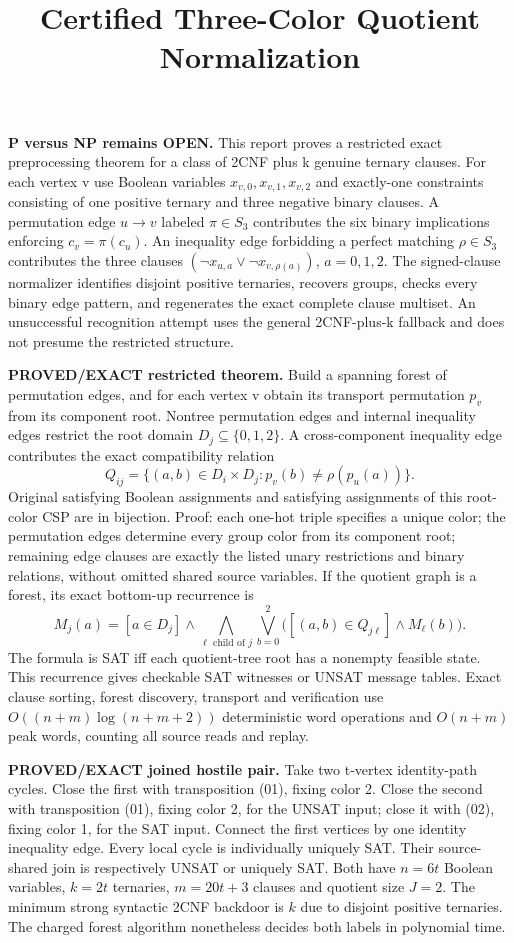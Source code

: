 \documentclass{article}
\title{Certified Three-Color Quotient Normalization}
\begin{document}
\maketitle
\textbf{P versus NP remains OPEN.}
This report proves a restricted exact preprocessing theorem for a class of 2CNF plus k genuine ternary clauses.
For each vertex v use Boolean variables $x_{v,0},x_{v,1},x_{v,2}$ and exactly-one constraints consisting of one positive ternary and three negative binary clauses. A permutation edge $u\to v$ labeled $\pi\in S_3$ contributes the six binary implications enforcing $c_v=\pi(c_u)$. An inequality edge forbidding a perfect matching $\rho\in S_3$ contributes the three clauses $(\neg x_{u,a}\vee\neg x_{v,\rho(a)})$, $a=0,1,2$.
The signed-clause normalizer identifies disjoint positive ternaries, recovers groups, checks every binary edge pattern, and regenerates the exact complete clause multiset. An unsuccessful recognition attempt uses the general 2CNF-plus-k fallback and does not presume the restricted structure.

\textbf{PROVED/EXACT restricted theorem.}
Build a spanning forest of permutation edges, and for each vertex v obtain its transport permutation $p_v$ from its component root. Nontree permutation edges and internal inequality edges restrict the root domain $D_j\subseteq\{0,1,2\}$. A cross-component inequality edge contributes the exact compatibility relation
\[
Q_{ij}=\{(a,b)\in D_i\times D_j:p_v(b)\ne\rho(p_u(a))\}.
\]
Original satisfying Boolean assignments and satisfying assignments of this root-color CSP are in bijection. Proof: each one-hot triple specifies a unique color; the permutation edges determine every group color from its component root; remaining edge clauses are exactly the listed unary restrictions and binary relations, without omitted shared source variables.
If the quotient graph is a forest, its exact bottom-up recurrence is
\[
M_j(a)=[a\in D_j]\wedge\bigwedge_{\ell\text{ child of }j}\bigvee_{b=0}^2
\bigl([(a,b)\in Q_{j\ell}]\wedge M_\ell(b)\bigr).
\]
The formula is SAT iff each quotient-tree root has a nonempty feasible state. This recurrence gives checkable SAT witnesses or UNSAT message tables. Exact clause sorting, forest discovery, transport and verification use $O((n+m)\log(n+m+2))$ deterministic word operations and $O(n+m)$ peak words, counting all source reads and replay.

\textbf{PROVED/EXACT joined hostile pair.}
Take two t-vertex identity-path cycles. Close the first with transposition (01), fixing color 2. Close the second with transposition (01), fixing color 2, for the UNSAT input; close it with (02), fixing color 1, for the SAT input. Connect the first vertices by one identity inequality edge. Every local cycle is individually uniquely SAT. Their source-shared join is respectively UNSAT or uniquely SAT. Both have $n=6t$ Boolean variables, $k=2t$ ternaries, $m=20t+3$ clauses and quotient size $J=2$. The minimum strong syntactic 2CNF backdoor is $k$ due to disjoint positive ternaries. The charged forest algorithm nonetheless decides both labels in polynomial time.
\end{document}
